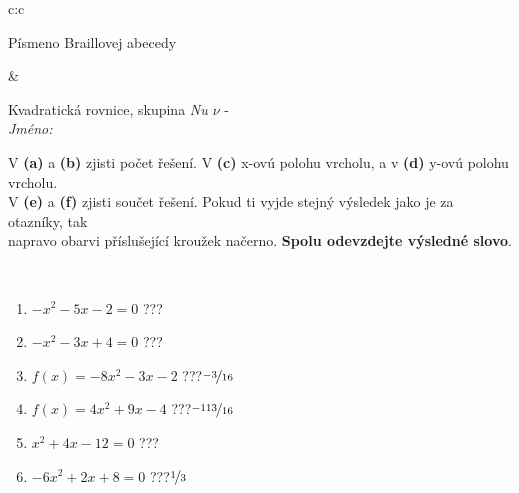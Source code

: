 \documentclass[10pt]{report}
\begin{document}
\begin{tabular}{c:c}
\begin{minipage}[c][104.5mm][t]{0.5\linewidth}
\begin{center}
\begin{minipage}{0.20\linewidth}
\begin{center}
{\small Písmeno Braillovej abecedy}
\end{center}
\end{minipage}
\end{center}
\end{minipage}
&
\begin{minipage}[c][104.5mm][t]{0.5\linewidth}
\begin{center}
\vspace{7mm}
{\huge Kvadratická rovnice, skupina \textit{Nu $\nu$} -}\\[5mm]
\textit{Jméno:}\phantom{xxxxxxxxxxxxxxxxxxxxxxxxxxxxxxxxxxxxxxxxxxxxxxxxxxxxxxxxxxxxxxxxx}\\[5mm]
\begin{minipage}{0.95\linewidth}
\begin{center}
V \textbf{(a)} a \textbf{(b)} zjisti počet řešení. V \textbf{(c)} x-ovú polohu vrcholu, a v \textbf{(d)} y-ovú polohu vrcholu.\\V \textbf{(e)} a \textbf{(f)} zjisti součet řešení. Pokud ti vyjde stejný výsledek jako je za otazníky, tak\\napravo obarvi příslušející kroužek načerno. \textbf{Spolu odevzdejte výsledné slovo}.
\end{center}
\end{minipage}
\\[1mm]
\begin{minipage}{0.79\linewidth}
\begin{center}
\begin{varwidth}{\linewidth}
\begin{enumerate}
\Large
\item $-x^2-5x-2=0$\quad \dotfill\; ???\;\dotfill {}
\item $-x^2-3x+4=0$\quad \dotfill\; ???\;\dotfill {}
\item $f(x)=-8x^2-3x-2$\quad \dotfill\; ???\;\dotfill \quad $\nicefrac{-3}{16}$
\item $f(x)=4x^2+9x-4$\quad \dotfill\; ???\;\dotfill \quad $\nicefrac{-113}{16}$
\item $x^2+4x-12=0$\quad \dotfill\; ???\;\dotfill {}
\item $-6x^2+2x+8=0$\quad \dotfill\; ???\;\dotfill \quad $\nicefrac{1}{3}$
\end{enumerate}
\end{varwidth}
\end{center}
\end{minipage}
\begin{minipage}{0.20\linewidth}
\begin{center}

\end{center}
\end{minipage}
\end{center}
\end{minipage}
\end{tabular}
\end{document}
